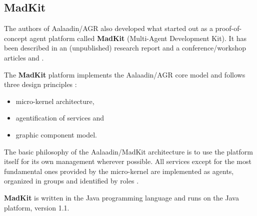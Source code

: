 \subsection{MadKit}

The authors of Aalaadin/AGR also developed what started out as a proof-of-concept agent platform called \textbf{MadKit} (Multi-Agent Development Kit).
It has been described in an (unpublished) research report \cite{Ferber97} and a conference/workshop articles \cite{Ferber98} and \cite{Gutknecht00}.

The \textbf{MadKit} platform implements the Aalaadin/AGR core model and follows three design principles \cite{Ferber97}:
\begin{itemize}
	\item micro-kernel architecture,
	\item agentification of services and
	\item graphic component model.
\end{itemize}

The basic philosophy of the Aalaadin/MadKit architecture is to use the platform itself for its own management wherever possible.
All services except for the most fundamental ones provided by the micro-kernel are implemented as agents, organized in groups and identified by roles \cite{Ferber98}.

\textbf{MadKit} is written in the Java programming language and runs on the Java platform, version 1.1.